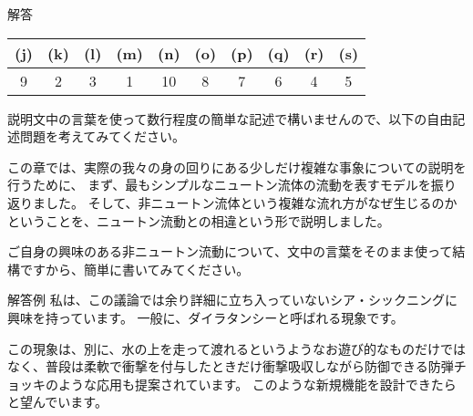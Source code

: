 \documentclass[uplatex,dvipdfmx,a4paper,11pt]{jsarticle}
\begin{document}
\begin{itembox}[l]{解答}
    \begin{center} 
      \begin{tabular}{|c|c|c|c|c|c|c|c|c|c|} \hline
        (j) & (k) & (l) & (m) & (n) & (o) & (p) & (q) & (r) & (s)\\ \hline
        9 & 2 & 3 & 1 & 10 & 8 & 7 & 6 & 4 & 5 \\ \hline		
      \end{tabular}
    \end{center}
\end{itembox}

説明文中の言葉を使って数行程度の簡単な記述で構いませんので、以下の自由記述問題を考えてみてください。
\begin{qlist}
\qitem この章では、実際の我々の身の回りにある少しだけ複雑な事象についての説明を行うために、
まず、最もシンプルなニュートン流体の流動を表すモデルを振り返りました。
そして、非ニュートン流体という複雑な流れ方がなぜ生じるのかということを、ニュートン流動との相違という形で説明しました。

ご自身の興味のある非ニュートン流動について、文中の言葉をそのまま使って結構ですから、簡単に書いてみてください。
\end{qlist}

\begin{itembox}[l]{解答例}
    私は、この議論では余り詳細に立ち入っていないシア・シックニングに興味を持っています。
	一般に、ダイラタンシーと呼ばれる現象です。

	この現象は、別に、水の上を走って渡れるというようなお遊び的なものだけではなく、普段は柔軟で衝撃を付与したときだけ衝撃吸収しながら防御できる防弾チョッキのような応用も提案されています。
	このような新規機能を設計できたらと望んでいます。	
\end{itembox}

\clearpage
\end{document}

